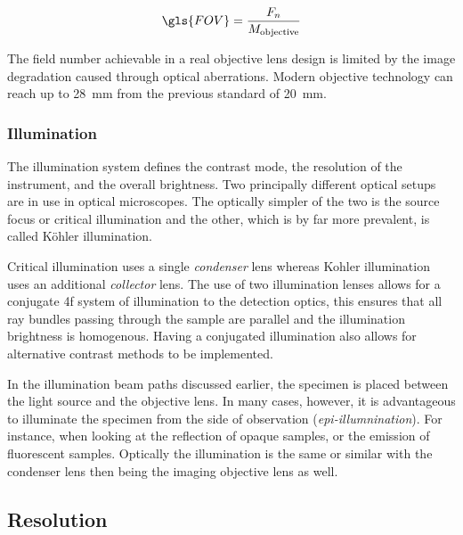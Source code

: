 \begin{align}
    \gls{FOV} = \frac{F_{n}}{M_{\text{objective}}}
\end{align}

The field number achievable in a real \gls{objective lens} design is limited by the image degradation caused through optical aberrations.
Modern objective technology can reach up to \SI{28}{\milli\meter} from the previous standard of \SI{20}{\milli\meter}.

\subsubsection{Illumination}

The illumination system defines the contrast mode, the resolution of the instrument, and the overall brightness.
Two principally different optical setups are in use in optical microscopes.
The optically simpler of the two is the source focus or critical illumination and the other, which is by far more prevalent, is called Köhler illumination.

Critical illumination uses a single \emph{condenser} lens whereas Kohler illumination uses an additional \emph{collector} lens.
The use of two illumination lenses allows for a conjugate \gls{4f}  system of illumination to the detection optics, this ensures that all ray bundles passing through the sample are parallel and the illumination brightness is homogenous.
Having a conjugated illumination also allows for alternative contrast methods to be implemented. %

In the illumination beam paths discussed earlier, the specimen is placed between the light source and the \gls{objective lens}.
In many cases, however, it is advantageous to illuminate the specimen from the side of observation (\emph{epi-illumnination}).
For instance, when looking at the reflection of opaque samples, or the emission of fluorescent samples.
Optically the illumination is the same or similar with the condenser lens then being the imaging \gls{objective lens} as well.

\subsection{Resolution}\label{sec:resolution}

